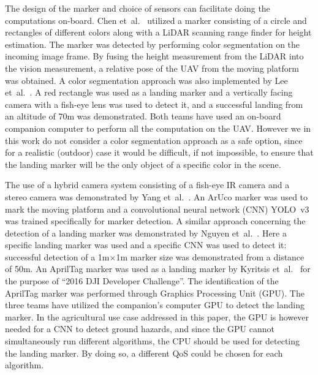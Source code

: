 \documentclass[conference]{IEEEtran}
\newcommand{\hemi}[2][]{\todo[color=green!20, #1]{HEMI: #2}}
\begin{document}

The design of the marker and choice of sensors can facilitate doing the computations on-board. %
%
Chen et~al.~\cite{chen2016system} utilized a marker consisting of a
circle and rectangles of different colors along with a LiDAR scanning
range finder for height estimation. The marker was detected by
performing color segmentation on the incoming image frame. By fusing
the height measurement from the LiDAR into the vision measurement, a
relative pose of the UAV from the moving platform was obtained. A
color segmentation approach was also implemented by Lee
et~al.~\cite{lee2016vision}. A red rectangle was used as a landing
marker and a vertically facing camera with a fish-eye lens was used to
detect it, and a successful landing from an altitude of 70m was
demonstrated. Both teams have used an on-board companion computer to
perform all the computation on the UAV. However we in this work do not consider a color segmentation
approach as a safe option, since for a realistic (outdoor)
case it would be difficult, if not impossible, to ensure that the
landing marker will be the only object of a specific color in the
scene.

The use of a hybrid camera system consisting of a fish-eye IR camera
and a stereo camera was demonstrated by Yang
et~al.~\cite{yang2018hybrid}. An ArUco marker was used to mark the
moving platform and a convolutional neural network (CNN) YOLO~v3 was
trained specifically for marker detection. A similar approach
concerning the detection of a landing marker was demonstrated by
Nguyen et~al.~\cite{nguyen2018lightdenseyolo}. Here a specific landing
marker was used and a specific CNN was used to detect it: successful
detection of a 1m$\times$1m marker size was demonstrated from a
distance of 50m. An AprilTag marker was used as a landing marker by
Kyritsis et~al.~\cite{kyristsis2016towards} for the purpose of ``2016
DJI Developer Challenge''. The identification of the AprilTag marker
was performed through Graphics Processing Unit (GPU). The three teams
have utilized the companion's computer GPU to detect the landing
marker. In the agricultural use case addressed in this paper, the GPU
is however needed for a CNN to detect ground hazards, and since the
GPU cannot simultaneously run different algorithms,
%
%
the CPU should be used for detecting the landing marker. By doing so,
a different QoS could be chosen for each algorithm.  
\end{document}
